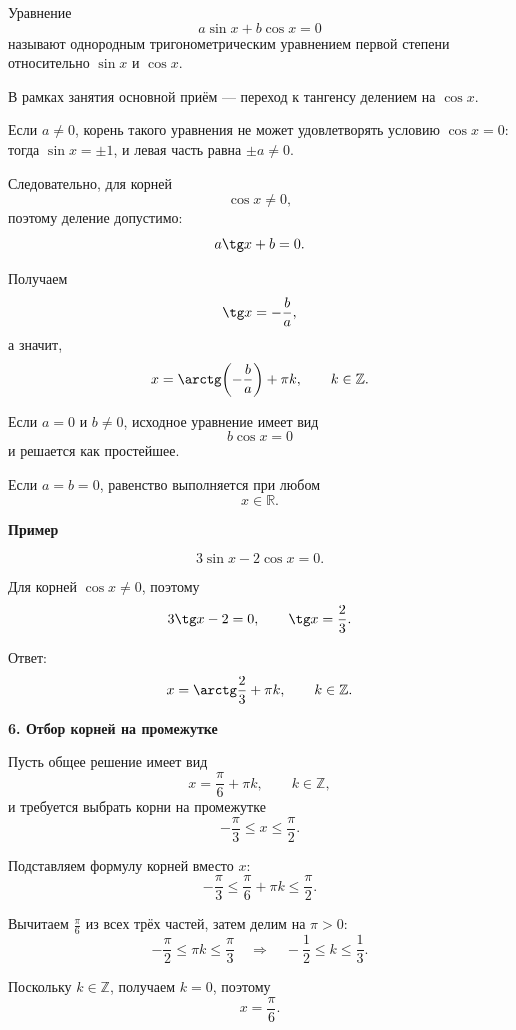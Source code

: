 \documentclass[a4paper,12pt]{article}
\newcommand{\sect}[1]{%
  \vspace{0.45em}%
  {\Large\bfseries\color{darkaccent}#1}\par
  \vspace{0.2em}%
  \noindent{\color{rulegray}\rule{\linewidth}{0.6pt}}%
  \vspace{0.35em}%
}
\newcommand{\subsect}[1]{%
  \vspace{0.35em}%
  {\large\bfseries\color{accent}#1}\par
  \vspace{0.1em}%
}
\newcommand{\Z}{\mathbb{Z}}
\newcommand{\R}{\mathbb{R}}
\begin{document}
Уравнение
\[
a\sin x+b\cos x=0
\]
называют однородным тригонометрическим уравнением первой степени относительно $\sin x$ и $\cos x$.

В рамках занятия основной приём --- переход к тангенсу делением
на $\cos x$.

Если $a\ne0$, корень такого уравнения не может удовлетворять условию
$\cos x=0$: тогда $\sin x=\pm1$, и левая часть равна
$\pm a\ne0$.

Следовательно, для корней
\[
\cos x\ne0,
\]
поэтому деление допустимо:
\[
a\tg x+b=0.
\]

Получаем
\[
\tg x=-\frac{b}{a},
\]
а значит,
\[
x=\arctg\!\left(-\frac{b}{a}\right)+\pi k,
\qquad k\in\Z.
\]

Если $a=0$ и $b\ne0$, исходное уравнение имеет вид
\[
b\cos x=0
\]
и решается как простейшее.

Если $a=b=0$, равенство выполняется при любом
\[
x\in\R.
\]

\subsect{Пример}

\[
3\sin x-2\cos x=0.
\]

Для корней $\cos x\ne0$, поэтому
\[
3\tg x-2=0,
\qquad
\tg x=\frac23.
\]

Ответ:
\[
x=\arctg\frac23+\pi k,
\qquad k\in\Z.
\]

\sect{6. Отбор корней на промежутке}

Пусть общее решение имеет вид
\[
x=\frac{\pi}{6}+\pi k,
\qquad k\in\Z,
\]
и требуется выбрать корни на промежутке
\[
-\frac{\pi}{3}\le x\le\frac{\pi}{2}.
\]

Подставляем формулу корней вместо $x$:
\[
-\frac{\pi}{3}
\le
\frac{\pi}{6}+\pi k
\le
\frac{\pi}{2}.
\]

Вычитаем $\frac{\pi}{6}$ из всех трёх частей, затем делим на $\pi>0$:
\[
-\frac{\pi}{2}\le\pi k\le\frac{\pi}{3}
\quad\Longrightarrow\quad
-\frac12\le k\le\frac13.
\]

Поскольку $k\in\Z$, получаем $k=0$, поэтому
\[
x=\frac{\pi}{6}.
\]

\begin{center}
\end{center}
\end{document}
